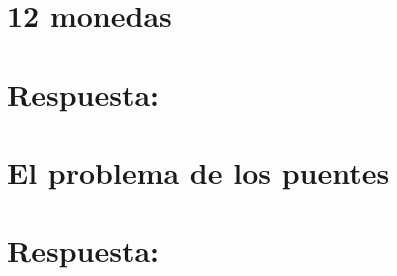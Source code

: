 \section{12 monedas}


\ifshowanswers
\section*{Respuesta:}

\fi

\section{El problema de los puentes}


\ifshowanswers
\section*{Respuesta:}

\fi